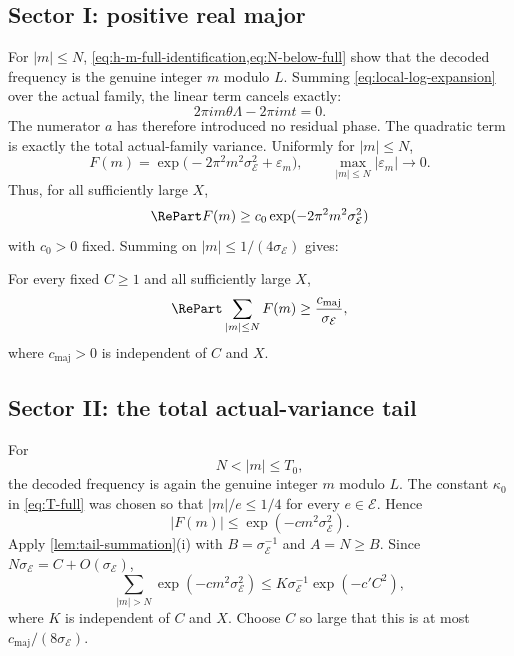\subsection{Sector I: positive real major}

For $|m|\leq N$, \cref{eq:h-m-full-identification,eq:N-below-full} show that the decoded frequency is the genuine integer $m$ modulo $L$.  Summing \cref{eq:local-log-expansion} over the actual family, the linear term cancels exactly:
\[
 2\pi i m\theta\Lambda-2\pi i mt=0.
\]
The numerator $a$ has therefore introduced no residual phase.  The quadratic term is exactly the total actual-family variance.  Uniformly for $|m|\leq N$,
\begin{equation}
\label{eq:major-local-gaussian}
 F(m)=\exp\bigl(-2\pi^2m^2\sigma_{\mathcal E}^2+\varepsilon_m\bigr),
 \qquad
 \max_{|m|\leq N}|\varepsilon_m|\longrightarrow0.
\end{equation}
Thus, for all sufficiently large $X$,
\[
 \RePart F(m)\geq c_0\exp(-2\pi^2m^2\sigma_{\mathcal E}^2)
\]
with $c_0>0$ fixed.  Summing on $|m|\leq1/(4\sigma_{\mathcal E})$ gives:

\begin{proposition}
\label{prop:positive-major}
For every fixed $C\geq1$ and all sufficiently large $X$,
\begin{equation}
\label{eq:positive-major}
 \RePart\sum_{|m|\leq N}F(m)
 \geq\frac{c_{\mathrm{maj}}}{\sigma_{\mathcal E}},
\end{equation}
where $c_{\mathrm{maj}}>0$ is independent of $C$ and $X$.
\end{proposition}

\subsection{Sector II: the total actual-variance tail}

For
\[
 N<|m|\leq T_0,
\]
the decoded frequency is again the genuine integer $m$ modulo $L$.  The constant $\kappa_0$ in \cref{eq:T-full} was chosen so that $|m|/e\leq1/4$ for every $e\in\mathcal E$.  Hence
\begin{equation}
\label{eq:full-variance-gaussian}
 |F(m)|\leq\exp(-c m^2\sigma_{\mathcal E}^2).
\end{equation}
Apply \cref{lem:tail-summation}(i) with $B=\sigma_{\mathcal E}^{-1}$ and $A=N\geq B$.  Since $N\sigma_{\mathcal E}=C+O(\sigma_{\mathcal E})$,
\begin{equation}
\label{eq:sector-II-tail}
 \sum_{|m|>N}\exp(-c m^2\sigma_{\mathcal E}^2)
 \leq K\sigma_{\mathcal E}^{-1}\exp(-c'C^2),
\end{equation}
where $K$ is independent of $C$ and $X$.  Choose $C$ so large that this is at most $c_{\mathrm{maj}}/(8\sigma_{\mathcal E})$.

